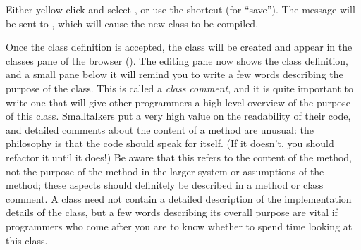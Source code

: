 \documentclass[a4paper,10pt,twoside]{book}
\begin{document}
Either yellow-click and select , or use the shortcut  (for ``save'').
The message will be sent to , which will cause the new class to be compiled.

Once the class definition is accepted, the class will be created and appear in the classes pane of the browser ().
The editing pane now shows the class definition, and a small pane below it will remind you to write a few words describing the purpose of the class. This is called a \emph{class comment}, and it is quite important to write one that will give other programmers a high-level overview of the purpose of this class.
Smalltalkers put a very high value on the readability of their code, and detailed comments about the content of a method are unusual: the philosophy is that the code should speak for itself. (If it doesn't, you should refactor it until it does!) 
Be aware that this refers to the content of the method, not the purpose of the method in the larger system or assumptions of the method; these aspects should definitely be described in a method or class comment.
A class  need not contain a detailed description of the implementation details of the class, but a few words describing its overall purpose are vital if programmers who come after you are to know whether to spend time looking at this class. 

\end{document}

